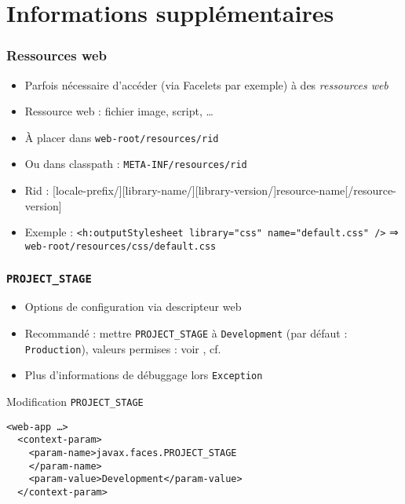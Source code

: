\documentclass[english, french]{beamer}
\begin{document}
\section[Suppl]{Informations supplémentaires}
\begin{frame}
	\frametitle{Ressources web}
	\begin{itemize}
		\item Parfois nécessaire d’accéder (via Facelets par exemple) à des \emph{ressources web}
		\item Ressource web : fichier image, script, …
		\item À placer dans \texttt{web-root/resources/rid}
		\item Ou dans classpath : \texttt{META-INF/resources/rid}
		\item Rid : [locale-prefix/][library-name/][library-version/]resource-name[/resource-version]
		\item Exemple : \texttt{<h:outputStylesheet library="css" name="default.css" />} ⇒ \texttt{web-root/resources/css/default.css}
	\end{itemize}
\end{frame}

\begin{frame}[fragile]
	\frametitle{\texttt{PROJECT\_STAGE}}
	\begin{itemize}
		\item Options de configuration via descripteur web
		\item Recommandé : mettre \texttt{PROJECT\_STAGE} à \texttt{Development} {\tiny (par défaut : \texttt{Production}), valeurs permises : voir , cf. }%
		\item Plus d’informations de débuggage lors \texttt{Exception}
	\end{itemize}
	\begin{exampleblock}{Modification \texttt{PROJECT\_STAGE}}
		\begin{lstlisting}
<web-app …>
  <context-param>
    <param-name>javax.faces.PROJECT_STAGE
    </param-name>
    <param-value>Development</param-value>
  </context-param>
		\end{lstlisting}
	\end{exampleblock}
\end{frame}
\end{document}
